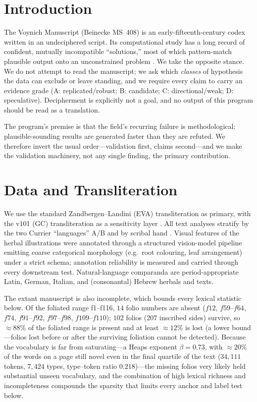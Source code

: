 \documentclass[11pt]{article}
\begin{document}
\section{Introduction}
The Voynich Manuscript (Beinecke MS~408) is an early-fifteenth-century codex written
in an undeciphered script. Its computational study has a long record of confident,
mutually incompatible ``solutions,'' most of which pattern-match plausible output onto
an unconstrained problem \citep{reddy2011know,bowern2021linguistics}. We take the
opposite stance. We do not attempt to read the manuscript; we ask which \emph{classes}
of hypothesis the data can exclude or leave standing, and we require every claim to
carry an evidence grade (A: replicated/robust; B: candidate; C: directional/weak; D:
speculative). Decipherment is explicitly not a goal, and no output of this program
should be read as a translation.

The program's premise is that the field's recurring failure is methodological:
plausible-sounding results are generated faster than they are refuted. We therefore
invert the usual order---validation first, claims second---and we make the validation
machinery, not any single finding, the primary contribution.

\section{Data and Transliteration}
We use the standard Zandbergen--Landini (EVA) transliteration as primary, with the
v101 (GC) transliteration as a sensitivity layer \citep{zandbergen_voynichnu}. All
text analyses stratify by the two Currier ``languages'' A/B \citep{currier1976} and by
scribal hand \citep{fagindavis2020hands}. Visual features of the herbal illustrations
were annotated through a structured vision-model pipeline emitting coarse categorical
morphology (e.g.\ root colouring, leaf arrangement) under a strict schema; annotation
reliability is measured and carried through every downstream test. Natural-language
comparanda are period-appropriate Latin, German, Italian, and (consonantal) Hebrew
herbals and texts.

The extant manuscript is also incomplete, which bounds every lexical statistic below.
Of the foliated range f1--f116, $14$ folio numbers are absent ($f12$, $f59$--$f64$,
$f74$, $f91$--$f92$, $f97$--$f98$, $f109$--$f110$); $102$ folios ($207$ inscribed
sides) survive, so $\approx\!88\%$ of the foliated range is present and at least
$\approx\!12\%$ is lost (a lower bound---folios lost before or after the surviving
foliation cannot be detected). Because the vocabulary is far from saturating---a Heaps
exponent $\beta=0.73$, with $\approx\!20\%$ of the words on a page still novel even in
the final quartile of the text ($34{,}111$ tokens, $7{,}424$ types, type--token ratio
$0.218$)---the missing folios very likely held substantial unseen vocabulary, and the
combination of high lexical richness and incompleteness compounds the sparsity that
limits every anchor and label test below.
\end{document}
